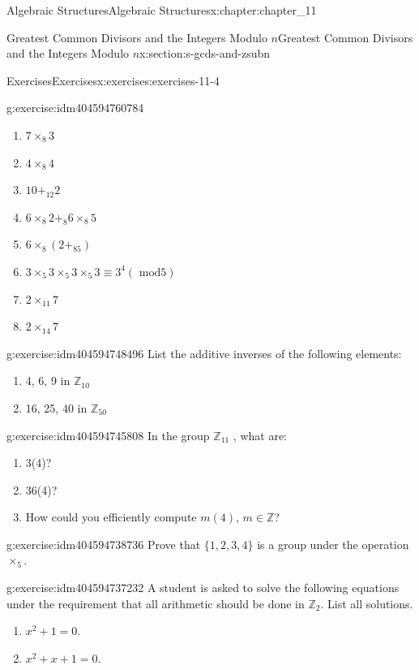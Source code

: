 \documentclass[twoside,10pt,]{book}
\numberwithin{equation}{section}
\begin{document}
\begin{chapterptx}{Algebraic Structures}{}{Algebraic Structures}{}{}{x:chapter:chapter_11}
\begin{sectionptx}{Greatest Common Divisors  and the Integers Modulo \(n\)}{}{Greatest Common Divisors  and the Integers Modulo \(n\)}{}{}{x:section:s-gcds-and-zsubn}
\begin{exercises-subsection}{Exercises}{}{Exercises}{}{}{x:exercises:exercises-11-4}
\begin{divisionexercise}{3}{}{}{g:exercise:idm404594760784}
\begin{multicols}{2}
\begin{enumerate}[label=(\alph*)]
\item{}\(7 \times_8 3\)%
\item{}\(4\times_8 4\)%
\item{}\(10+_{12} 2\)%
\item{}\(6\times_8 2 +_8 6\times_8 5 \)%
\item{}\(6\times_8 \left(2 +_85\right)\)%
\item{}\(3 \times_5  3 \times_5  3 \times_5  3 \equiv  3^4 (\textrm{ mod} 5)\)%
\item{}\(2 \times_{11}7\)%
\item{}\(2 \times_{14}7\)%
\end{enumerate}
\end{multicols}
%
\end{divisionexercise}%
\begin{divisionexercise}{4}{}{}{g:exercise:idm404594748496}%
List the additive inverses of the following elements:%
\begin{enumerate}[label=(\alph*)]
\item{}4, 6, 9 in \(\mathbb{Z}_{10}\)%
\item{}16, 25, 40 in \(\mathbb{Z}_{50}\)%
\end{enumerate}
%
\end{divisionexercise}%
\begin{divisionexercise}{5}{}{}{g:exercise:idm404594745808}%
In the group \(\mathbb{Z}_{11}\) , what are:%
\begin{enumerate}[label=(\alph*)]
\item{}3(4)?%
\item{}36(4)?%
\item{}How could you efficiently compute \(m(4)\), \(m \in  \mathbb{Z}\)?%
\end{enumerate}
%
\end{divisionexercise}%
\begin{divisionexercise}{6}{}{}{g:exercise:idm404594738736}%
Prove that \(\{1, 2, 3, 4\}\) is a group under the operation \(\times_5 \).%
\end{divisionexercise}%
\begin{divisionexercise}{7}{}{}{g:exercise:idm404594737232}%
A student is asked to solve the following equations under the requirement that all arithmetic should be done in \(\mathbb{Z}_2\). List all solutions.%
\begin{enumerate}[label=(\alph*)]
\item{}\(x^2 + 1 = 0\).%
\item{}\(x^2 + x + 1 = 0\).%
\end{enumerate}

\end{divisionexercise}
\end{exercises-subsection}
\end{sectionptx}
\end{chapterptx}
\end{document}
